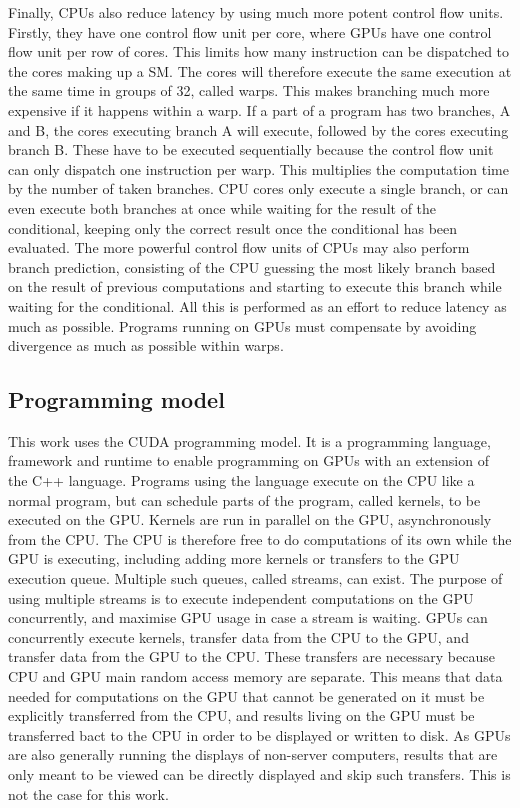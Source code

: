 Finally, CPUs also reduce latency by using much more potent control flow units. Firstly, they have
one control flow unit per core, where GPUs have one control flow unit per row of cores. This limits
how many instruction can be dispatched to the cores making up a SM. The cores will therefore execute
the same execution at the same time in groups of 32, called warps. This makes branching much more
expensive if it happens within a warp. If a part of a program has two branches, A and B, the cores
executing branch A will execute, followed by the cores executing branch B. These have to be executed
sequentially because the control flow unit can only dispatch one instruction per warp. This
multiplies the computation time by the number of taken branches. CPU cores only execute a single
branch, or can even execute both branches at once while waiting for the result of the conditional,
keeping only the correct result once the conditional has been evaluated. The more powerful control
flow units of CPUs may also perform branch prediction, consisting of the CPU guessing the most
likely branch based on the result of previous computations and starting to execute this branch while
waiting for the conditional. All this is performed as an effort to reduce latency as much as
possible. Programs running on GPUs must compensate by avoiding divergence as much as possible within
warps.

\subsection{Programming model} \label{section:graphics_processing_units:architecture:programming_model}

This work uses the CUDA programming model. It is a programming language, framework and runtime to
enable programming on GPUs with an extension of the C++ language. Programs using the language
execute on the CPU like a normal program, but can schedule parts of the program, called kernels, to
be executed on the GPU. Kernels are run in parallel on the GPU, asynchronously from the CPU. The CPU
is therefore free to do computations of its own while the GPU is executing, including adding more
kernels or transfers to the GPU execution queue. Multiple such queues, called streams, can exist.
The purpose of using multiple streams is to execute independent computations on the GPU
concurrently, and maximise GPU usage in case a stream is waiting. GPUs can concurrently execute
kernels, transfer data from the CPU to the GPU, and transfer data from the GPU to the CPU. These
transfers are necessary because CPU and GPU main random access memory are separate. This means that
data needed for computations on the GPU that cannot be generated on it must be explicitly
transferred from the CPU, and results living on the GPU must be transferred bact to the CPU in order
to be displayed or written to disk. As GPUs are also generally running the displays of non-server
computers, results that are only meant to be viewed can be directly displayed and skip such
transfers. This is not the case for this work.


